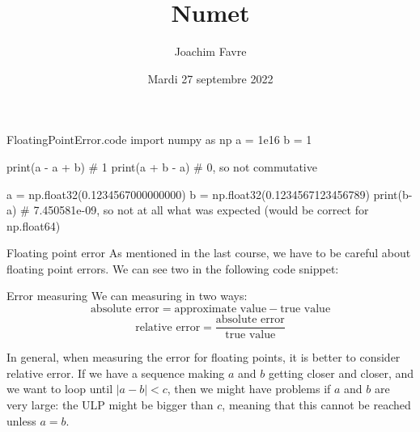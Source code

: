 \documentclass[a4paper]{article}
\title{Numet}
\author{Joachim Favre}
\date{Mardi 27 septembre 2022}
\begin{document}
\maketitle


\begin{filecontents*}[overwrite]{FloatingPointError.code}
import numpy as np
a = 1e16
b = 1

print(a - a + b) # 1
print(a + b - a) # 0, so not commutative

a = np.float32(0.1234567000000000)
b = np.float32(0.1234567123456789)
print(b-a)  # 7.450581e-09, so not at all what was expected (would be correct for np.float64)
\end{filecontents*}

\begin{parag}{Floating point error}
    As mentioned in the last course, we have to be careful about floating point errors. We can see two in the following code snippet:
\end{parag}

\begin{parag}{Error measuring}
    We can measuring in two ways: 
    \[\text{absolute error} = \text{approximate value} - \text{true value}\] 
    \[\text{relative error} = \frac{\text{absolute error}}{\text{true value}}\]

    In general, when measuring the error for floating points, it is better to consider relative error. If we have a sequence making $a$ and $b$ getting closer and closer, and we want to loop until $\left|a - b\right| < c$, then we might have problems if $a$ and $b$ are very large: the ULP might be bigger than $c$, meaning that this cannot be reached unless $a = b$. 
\end{parag}
\end{document}
